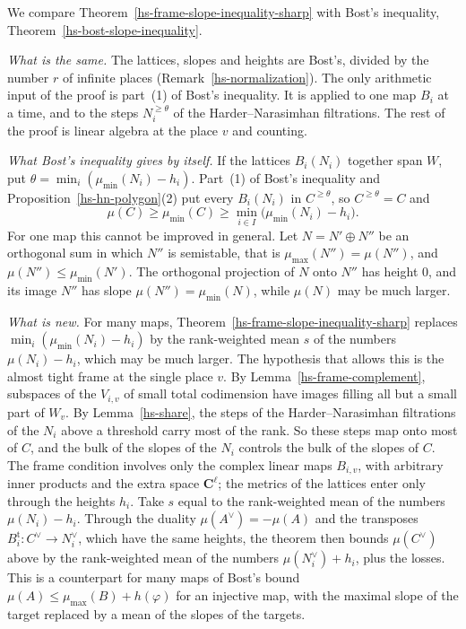 \begin{remark}\label{hs-comparison-with-bost}
We compare Theorem~\ref{hs-frame-slope-inequality-sharp} with Bost's inequality,
Theorem~\ref{hs-bost-slope-inequality}.

\emph{What is the same.} The lattices, slopes and heights are Bost's, divided by the number $r$
of infinite places (Remark~\ref{hs-normalization}). The only arithmetic input of the proof is
part~(1) of Bost's inequality. It is applied to one map $B_i$ at a time, and to the steps
$N_i^{\geq\theta}$ of the Harder--Narasimhan filtrations. The rest of the proof is linear
algebra at the place $v$ and counting.

\emph{What Bost's inequality gives by itself.} If the lattices $B_i(N_i)$ together span $W$,
put $\theta=\min_i(\mu_{\min}(N_i)-h_i)$. Part~(1) of Bost's inequality and
Proposition~\ref{hs-hn-polygon}(2) put every $B_i(N_i)$ in $C^{\geq\theta}$, so
$C^{\geq\theta}=C$ and
\[
 \mu(C)\geq\mu_{\min}(C)\geq\min_{i\in I}\big(\mu_{\min}(N_i)-h_i\big).
\]
For one map this cannot be improved in general. Let $N=N'\oplus N''$ be an orthogonal sum in
which $N''$ is semistable, that is $\mu_{\max}(N'')=\mu(N'')$, and $\mu(N'')\leq\mu_{\min}(N')$.
The orthogonal projection of $N$ onto $N''$ has height $0$, and its image $N''$ has slope
$\mu(N'')=\mu_{\min}(N)$, while $\mu(N)$ may be much larger.

\emph{What is new.} For many maps, Theorem~\ref{hs-frame-slope-inequality-sharp} replaces
$\min_i(\mu_{\min}(N_i)-h_i)$ by the rank-weighted mean $s$ of the numbers $\mu(N_i)-h_i$,
which may be much larger. The hypothesis that allows this is the almost tight frame at the
single place $v$. By Lemma~\ref{hs-frame-complement}, subspaces of the $V_{i,v}$ of small total
codimension have images filling all but a small part of $W_v$. By Lemma~\ref{hs-share}, the steps
of the Harder--Narasimhan filtrations of the $N_i$ above a threshold carry most of the rank. So
these steps map onto most of $C$, and the bulk of the slopes of the $N_i$ controls the bulk of
the slopes of $C$. The frame condition involves only the complex linear maps $B_{i,v}$, with
arbitrary inner products and the extra space $\mathbf C^\ell$; the metrics of the lattices enter
only through the heights $h_i$. Take $s$ equal to the rank-weighted mean of the numbers
$\mu(N_i)-h_i$. Through the duality $\mu(A^\vee)=-\mu(A)$ \cite[\S1.3]{Bos20} and the
transposes $B_i^{\mathrm t}:C^\vee\to N_i^\vee$, which have the same heights, the theorem then
bounds $\mu(C^\vee)$ above by the rank-weighted mean of the numbers $\mu(N_i^\vee)+h_i$, plus the
losses. This is a counterpart for many maps of Bost's bound
$\mu(A)\leq\mu_{\max}(B)+h(\varphi)$ for an injective map, with the maximal slope of the target
replaced by a mean of the slopes of the targets.


\end{remark}

